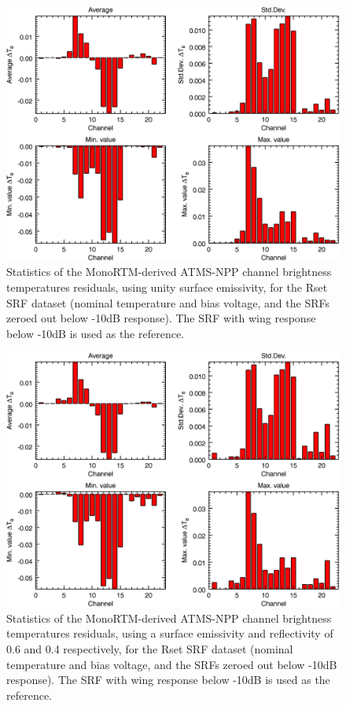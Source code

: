 \begin{figure}[H]
  \centering
    \includegraphics[bb=0 0 416 333,clip,scale=0.9]{graphics/dtb/Rset/e1.0_r0.0/stats_ref-nominal.png} 
  \caption{Statistics of the MonoRTM-derived ATMS-NPP channel brightness temperatures residuals, using unity surface emissivity, for the Rset SRF dataset (nominal temperature and bias voltage, and the SRFs zeroed out below -10dB response). The SRF with wing response below -10dB is used as the reference.}
  \label{fig:Rset_e1.0_r0.0_stats_ref-nominal}
\end{figure}

\begin{figure}[H]
  \centering
    \includegraphics[bb=0 0 416 333,clip,scale=0.9]{graphics/dtb/Rset/e0.6_r0.4/stats_ref-nominal.png} 
  \caption{Statistics of the MonoRTM-derived ATMS-NPP channel brightness temperatures residuals, using a surface emissivity and reflectivity of 0.6 and 0.4 respectively, for the Rset SRF dataset (nominal temperature and bias voltage, and the SRFs zeroed out below -10dB response). The SRF with wing response below -10dB is used as the reference.}
  \label{fig:Rset_e0.6_r0.4_stats_ref-nominal}
\end{figure}


